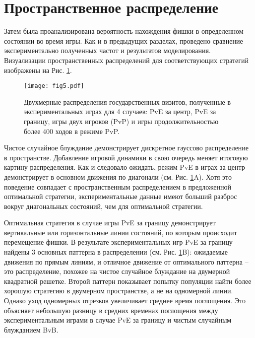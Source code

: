 \section{Пространственное распределение}\label{sec:ch3/sec4}

Затем была проанализирована вероятность нахождения фишки в определенном состоянии во время игры. 
Как и в предыдущих разделах, проведено сравнение экспериментально полученных частот и результатов моделирования. 
Визуализации пространственных распределений для соответствующих стратегий изображены на Рис. \ref{fig:5}.

\begin{figure}[t]
    \begin{center}
    \texttt{[image: fig5.pdf]}
    \caption{
        Двухмерные распределения государственных визитов, полученные в экспериментальных играх для 4 случаев: 
        PvE за центр, PvE за границу, игры двух игроков (PvP) и игры продолжительностью более 400 ходов в режиме PvP.
    }  
    \label{fig:5}
    \end{center}
\end{figure}

Чистое случайное блуждание демонстрирует дискретное гауссово распределение в пространстве. 
Добавление игровой динамики в свою очередь меняет итоговую картину распределения. 
Как и следовало ожидать, режим PvE в играх за центр демонстрирует в основном движения по диагонали (см. Рис. \ref{fig:5}A). 
Хотя это поведение совпадает с пространственным распределением в предложенной оптимальной стратегии, 
экспериментальные данные имеют больший разброс вокруг диагональных состояний, чем для оптимальной стратегии.

Оптимальная стратегия в случае игры PvE за границу демонстрирует вертикальные или горизонтальные линии состояний, 
по которым происходит перемещение фишки. В результате экспериментальных игр PvE за границу найдены 
3 основных паттерна в распределении (см. Рис. \ref{fig:5}B): ожидаемые движения по прямым линиям, и 
отличное движение от оптимального паттерна -- это распределение, похожее на чистое случайное блуждание на двумерной квадратной решетке. 
Второй паттерн показывает попытку популяции найти более хорошую стратегию в двумерном пространстве, а не на одномерной линии. 
Однако уход одномерных отрезков увеличивает среднее время поглощения. Это объясняет небольшую разницу в средних временах 
поглощения между экспериментальным играми в случае PvE за границу и чистым случайным блужданием BvB.


